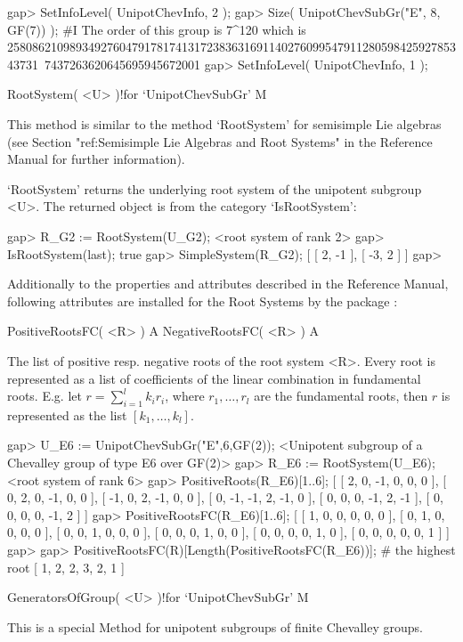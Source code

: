 \beginexample
gap> SetInfoLevel( UnipotChevInfo, 2 );
gap> Size( UnipotChevSubGr("E", 8, GF(7)) );
#I  The order of this group is 7^120 which is
25808621098934927604791781741317238363169114027609954791128059842592785343731\
7437263620645695945672001
gap> SetInfoLevel( UnipotChevInfo, 1 );
\endexample


\>RootSystem( <U> )!{for `UnipotChevSubGr'} M

This  method is similar  to the  method `RootSystem'  for semisimple  Lie
algebras (see Section "ref:Semisimple  Lie Algebras and Root  Systems" in
the {\GAP} Reference Manual for further information).

`RootSystem' returns the underlying root system of the unipotent subgroup
<U>. The returned object is from the category `IsRootSystem':

\beginexample
gap> R_G2 := RootSystem(U_G2);
<root system of rank 2>
gap> IsRootSystem(last);
true
gap> SimpleSystem(R_G2);
[ [ 2, -1 ], [ -3, 2 ] ]
gap>
\endexample

Additionally to the properties and attributes described in the  Reference
Manual, following attributes  are installed for the  Root  Systems by the
package {\Unipot}:

\>PositiveRootsFC( <R> ) A
\>NegativeRootsFC( <R> ) A

The list of positive resp. negative  roots of the root system <R>.  Every
root is  represented as a list of coefficients  of the linear combination
in fundamental  roots. E.g.  let  $r=\sum_{i=1}^l  k_ir_i$,  where  $r_1,
\dots, r_l$ are the  fundamental roots,  then  $r$ is represented as  the
list $[k_1, \dots, k_l]$.

\beginexample
gap> U_E6 := UnipotChevSubGr("E",6,GF(2));
<Unipotent subgroup of a Chevalley group of type E6 over GF(2)>
gap> R_E6 := RootSystem(U_E6);
<root system of rank 6>
gap> PositiveRoots(R_E6){[1..6]};
[ [ 2,  0, -1, 0,  0, 0 ], [ 0, 2, 0, -1, 0,  0 ], [ -1, 0, 2, -1,  0, 0 ],
  [ 0, -1, -1, 2, -1, 0 ], [ 0, 0, 0, -1, 2, -1 ], [  0, 0, 0,  0, -1, 2 ] ]
gap> PositiveRootsFC(R_E6){[1..6]};
[ [ 1, 0, 0, 0, 0, 0 ], [ 0, 1, 0, 0, 0, 0 ], [ 0, 0, 1, 0, 0, 0 ],
  [ 0, 0, 0, 1, 0, 0 ], [ 0, 0, 0, 0, 1, 0 ], [ 0, 0, 0, 0, 0, 1 ] ]
gap>
gap> PositiveRootsFC(R)[Length(PositiveRootsFC(R_E6))]; # the highest root
[ 1, 2, 2, 3, 2, 1 ]
\endexample

\>GeneratorsOfGroup( <U> )!{for `UnipotChevSubGr'} M

This  is a special Method  for unipotent  subgroups of  finite  Chevalley
groups.

